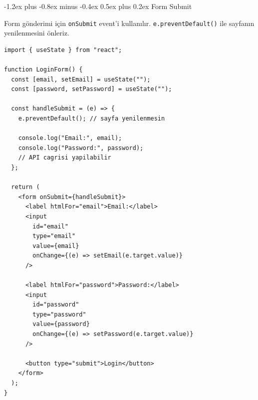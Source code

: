 \documentclass[12pt, a4paper]{article}
\makeatletter
\renewcommand{\subsection}{%
  \@startsection{subsection}{2}{\z@}%
    {-1.2ex plus -0.8ex minus -0.4ex}%
    {0.5ex plus 0.2ex}%
    {\normalfont\large\bfseries\sffamily\color{secondary}}%
}
\makeatother
\begin{document}
\begin{center}
\end{center}

\subsection{Form Submit}

Form gönderimi için \texttt{onSubmit} event'i kullanılır.
\texttt{e.preventDefault()} ile sayfanın yenilenmesini önleriz.

\vspace{6pt}

\begin{tcolorbox}[enhanced, colback=codebg, colframe=gray!30,
    colbacktitle=primary!85!black, coltitle=white, arc=4pt,
    title={\sffamily\bfseries\small Form Submit Örneği}]
\begin{lstlisting}[style=jsxstyle]
import { useState } from "react";

function LoginForm() {
  const [email, setEmail] = useState("");
  const [password, setPassword] = useState("");

  const handleSubmit = (e) => {
    e.preventDefault(); // sayfa yenilenmesin

    console.log("Email:", email);
    console.log("Password:", password);
    // API cagrisi yapilabilir
  };

  return (
    <form onSubmit={handleSubmit}>
      <label htmlFor="email">Email:</label>
      <input
        id="email"
        type="email"
        value={email}
        onChange={(e) => setEmail(e.target.value)}
      />

      <label htmlFor="password">Password:</label>
      <input
        id="password"
        type="password"
        value={password}
        onChange={(e) => setPassword(e.target.value)}
      />

      <button type="submit">Login</button>
    </form>
  );
}
\end{lstlisting}
\end{tcolorbox}
\end{document}
